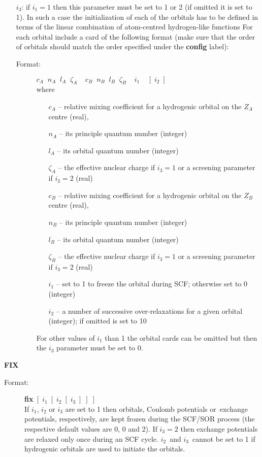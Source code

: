 \documentclass[12pt,a4paper]{article}
\begin{document}
\begin{description}
\begin{description}
\begin{itemize}
\item[$i_3$:] if $i_1=1$ then this parameter must be set to 1 or 2 (if
  omitted it is set to 1). In such a case the initialization of
  each of the orbitals has to be defined in terms of the linear
  combination of atom-centred hydrogen-like functions
  For each orbital include a card of the
  following format (make sure that the order of orbitals should match
  the order specified under the \textbf{config} label):
\begin{description}
\item[Format:] $c_A\;\;n_A \;\;l_A \;\;\zeta_A \;\;\;\;c_B\;\;n_B\;\;l_B\;\;
  \zeta_B\;\;\;\;i_1\;\;\;\;[\;i_2\;]$ \\
where
\begin{itemize}
\item[] $c_A$ -- relative mixing coefficient for a hydrogenic orbital on the
                    $Z_A$ centre (real),
\item[] $n_A$ -- its principle quantum number (integer)
\item[] $l_A$ -- its orbital quantum number (integer)
\item[] $\zeta_A$ -- the effective nuclear charge if $i_3=1$ or
a screening parameter if $i_3=2$ (real)
\item[] $c_B$  -- relative mixing coefficient for a hydrogenic orbital on the
                    $Z_B$ centre (real),
\item[] $n_B$ -- its principle quantum number (integer)
\item[] $l_B$ -- its orbital quantum number (integer)
\item[] $\zeta_B$ -- the effective nuclear charge if $i_3=1$ or
a screening parameter if $i_3=2$ (real)
\item[] $i_1$ -- set to 1 to freeze the orbital during SCF; otherwise
  set to 0 (integer)
\item[] $i_2$ -- a number of successive over-relaxations for a given orbital
(integer); if omitted is set to 10
\end{itemize}

For other values of $i_1$ than 1 the orbital cards can be omitted but
then the $i_3$ parameter must be set to 0.

\end{description}
\end{itemize}
\end{description}

\item \textbf{FIX}
\begin{description}
\item[Format:] \textbf{fix}  $[\;i_1\;[\;i_2\;[\;i_3\;]\;]\;]$\\
  If $i_1$, $i_2$ or $i_3$ are set to 1 then orbitals, Coulomb
  potentials or~exchange potentials, respectively, are kept frozen during the
  SCF/SOR process (the respective default values are 0, 0 and 2).
  If $i_3=2$ then exchange potentials are relaxed only once during an
  SCF cycle.  $i_2$~and $i_3$~cannot be set to 1 if hydrogenic
    orbitals are used to initiate the orbitals.
\end{description}



\end{description}
\end{document}
